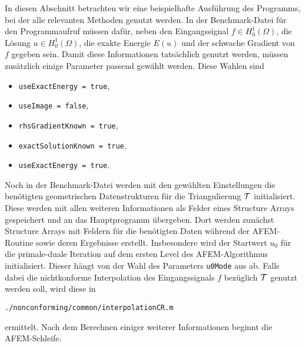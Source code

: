In diesen Abschnitt betrachten wir eine beispielhafte Ausführung des Programms,
bei der alle relevanten Methoden genutzt werden.
In der Benchmark-Datei für den Programmaufruf müssen dafür, neben den
Eingangssignal $f\in H^1_0(\Omega)$, die Lösung $u\in H^1_0(\Omega)$, die
exakte Energie $E(u)$ und der schwache Gradient von $f$ gegeben sein. 
Damit diese Informationen tatsächlich genutzt werden, müssen zusätzlich einige
Parameter passend gewählt werden. 
Diese Wahlen sind
\begin{itemize}
  \item \texttt{useExactEnergy = true},
  \item \texttt{useImage = false},
  \item \texttt{rhsGradientKnown = true},
  \item \texttt{exactSolutionKnown = true},
  \item \texttt{useExactEnergy = true}.
\end{itemize}
Noch in der Benchmark-Datei werden mit den gewählten Einstellungen die
benötigten geometrischen Datenstrukturen für die Triangulierung $\mathcal{T}$
initialisiert. 
Diese werden mit allen weiteren Informationen als Felder eines Structure Arrays
gespeichert und an das Hauptprogramm übergeben. 
Dort werden zunächst Structure Arrays mit Feldern für die benötigten Daten
während der AFEM-Routine sowie deren Ergebnisse erstellt. 
Insbesondere wird der Startwert $u_0$ für die primale-duale Iteration
auf dem ersten Level des AFEM-Algorithmus initialisiert. 
Dieser hängt von der Wahl des Parameters \texttt{u0Mode} aus
 ab.
Falls dabei die nichtkonforme Interpolation des Eingangssignals $f$ 
bezüglich $\mathcal{T}$ genutzt werden soll, wird diese in
\begin{center}
  \texttt{./nonconforming/common/interpolationCR.m}
\end{center}
ermittelt.
Nach dem Berechnen einiger weiterer Informationen beginnt die AFEM-Schleife.

